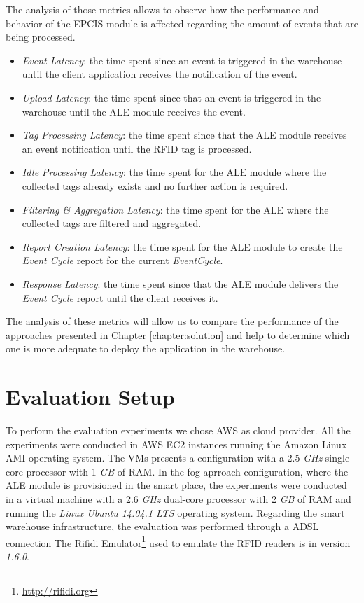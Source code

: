 The analysis of those metrics allows to observe how the performance and behavior of the \gls{EPCIS}
module is affected regarding the amount of events that are being processed.

\begin{itemize}
  \item \textit{Event Latency}: the time spent since an event is triggered in the warehouse until
  the client application receives the notification of the event.
  \item \textit{Upload Latency}: the time spent since that an event is triggered in the warehouse until
  the \gls{ALE} module receives the event.
  \item \textit{Tag Processing Latency}: the time spent since that the \gls{ALE} module receives an event
  notification until the \gls{RFID} tag is processed.
  \item \textit{Idle Processing Latency}: the time spent for the \gls{ALE} module where the collected
  tags already exists and no further action is required.
  \item \textit{Filtering \& Aggregation Latency}: the time spent for the \gls{ALE} where the
  collected tags are filtered and aggregated.
  \item \textit{Report Creation Latency}: the time spent for the \gls{ALE} module to create the
  \textit{Event Cycle} report for the current \textit{EventCycle}.
  \item \textit{Response Latency}: the time spent since that the \gls{ALE} module delivers the
  \textit{Event Cycle} report until the client receives it.
\end{itemize}

The analysis of these metrics will allow us to compare the performance of the approaches presented
in Chapter \ref{chapter:solution} and help to determine which one is more adequate to deploy the
application in the warehouse.

\section{Evaluation Setup}
\label{sec:eval_setup}
To perform the evaluation experiments we chose \gls{AWS} as cloud provider. All the experiments were
conducted in \gls{AWS} \gls{EC2} instances running the Amazon Linux AMI operating system. The \glspl{VM}
presents a configuration with a 2.5 \textit{\gls{GHz}} single-core processor with 1 \textit{\gls{GB}} of
\gls{RAM}. In the fog-aprroach configuration, where the \gls{ALE} module is provisioned in the smart place,
the experiments were conducted in a virtual machine with a 2.6 \textit{\gls{GHz}} dual-core processor
with 2 \textit{\gls{GB}} of \gls{RAM} and running the \textit{Linux Ubuntu 14.04.1 LTS} operating system.
Regarding the smart warehouse infrastructure, the evaluation was performed through a \gls{ADSL} connection
The Rifidi Emulator\footnote{\url{http://rifidi.org}} used to emulate the \gls{RFID} readers is in
version \textit{1.6.0}.\\

